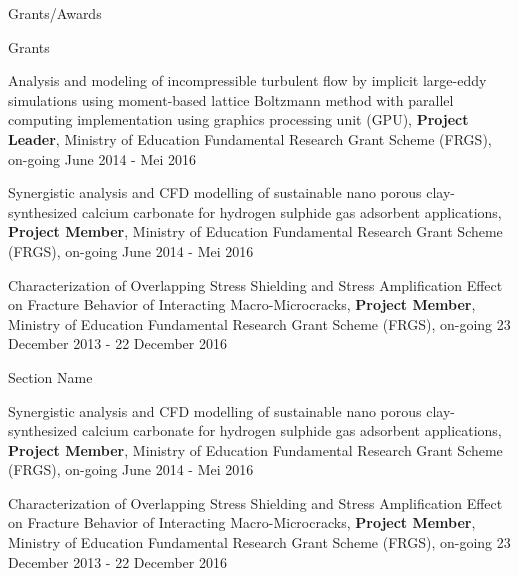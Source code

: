 \documentclass{resume} %
\begin{document}
\begin{rSection}{Grants/Awards}
\begin{rSubsection}{Grants}{}{}{}

\item Analysis and modeling of incompressible turbulent flow by implicit large-eddy simulations using moment-based lattice Boltzmann method with parallel computing implementation using graphics processing unit (GPU), \textbf{Project Leader}, Ministry of Education Fundamental Research Grant Scheme (FRGS), on-going June 2014 - Mei 2016

\item Synergistic analysis and CFD modelling of sustainable nano porous clay-synthesized calcium carbonate for hydrogen sulphide gas adsorbent applications, 
\textbf{Project Member}, Ministry of Education Fundamental Research Grant Scheme (FRGS), on-going June 2014 - Mei 2016

\item Characterization of Overlapping Stress Shielding and Stress Amplification Effect on Fracture Behavior of Interacting Macro-Microcracks, 
\textbf{Project Member}, Ministry of Education Fundamental Research Grant Scheme (FRGS), on-going 23 December 2013 - 22 December 2016


\end{rSubsection}
\end{rSection}

\begin{rSection}{Section Name}
\begin{redlabel}

\item Synergistic analysis and CFD modelling of sustainable nano porous clay-synthesized calcium carbonate for hydrogen sulphide gas adsorbent applications, 
\textbf{Project Member}, Ministry of Education Fundamental Research Grant Scheme (FRGS), on-going June 2014 - Mei 2016

\item Characterization of Overlapping Stress Shielding and Stress Amplification Effect on Fracture Behavior of Interacting Macro-Microcracks, 
\textbf{Project Member}, Ministry of Education Fundamental Research Grant Scheme (FRGS), on-going 23 December 2013 - 22 December 2016

\end{redlabel}
\end{rSection}
\end{document}
